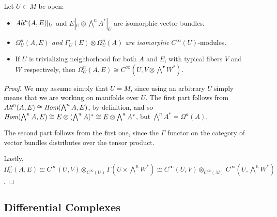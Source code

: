 \lin

\begin{proposition}\label{propositionIsomorphOmegas}
Let $U\subset M$ be open:
    \begin{itemize}
    
    \item $\operatorname{\textit{Alt}}^n(A, E)|_U$ and $E|_U \otimes \bigwedge^n A^*|_U$ are isomorphic vector bundles.
    
    
    \item \textit{$\Omega_U^n(A, E)$ and $\Gamma_U(E) \otimes \Omega_U^n(A)$ are isomorphic} $C^\infty(U)$-modules.
    
    \item If $U$ is trivializing neighborhood for both $A$ and $E$, with typical fibers $V$ and $W$ respectively, then $\Omega_U^n(A, E) \cong C^\infty(U, V \otimes \bigwedge^\bullet W^*)$.
    
    
    \end{itemize}
\end{proposition}

\begin{proof}
We may assume simply that $U = M$, since using an arbitrary $U$ simply means that we are working on manifolds over $U$. The first part follows from $\operatorname{\textit{Alt}}^n(A, E) \cong \operatorname{\textit{Hom}}(\bigwedge^n A, E)$, by definition, and so $\operatorname{\textit{Hom}}(\bigwedge^n A, E) \cong E \otimes (\bigwedge^n A)^* \cong E \otimes \bigwedge^n A^*$, but $\bigwedge^n A^* = \Omega^n(A)$.

The second part follows from the first one, since the $\Gamma$ functor on the category of vector bundles distributes over the tensor product.

Lastly, $\Omega_U^n(A, E) \cong C^\infty(U, V) \otimes_{C^\infty(U)} \Gamma(U \times \bigwedge^n W^*) \cong C^\infty(U, V) \otimes_{C^\infty(M)} C^\infty\left(U, \bigwedge^n W^* \right)$.
\end{proof}

\subsection{Differential Complexes}


